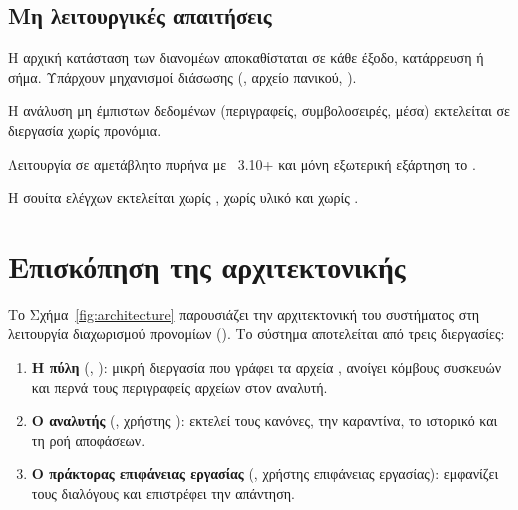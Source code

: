 \subsection{Μη λειτουργικές απαιτήσεις}

\begin{requirement}\label{req:lockout}
Η αρχική κατάσταση των διανομέων αποκαθίσταται σε κάθε έξοδο, κατάρρευση ή
σήμα. Υπάρχουν μηχανισμοί διάσωσης (, αρχείο πανικού,
).
\end{requirement}

\begin{requirement}\label{req:privsep}
Η ανάλυση μη έμπιστων δεδομένων (περιγραφείς, συμβολοσειρές, μέσα) εκτελείται σε
διεργασία χωρίς προνόμια.
\end{requirement}

\begin{requirement}[Φορητότητα]\label{req:portable}
Λειτουργία σε αμετάβλητο πυρήνα  με ~3.10+ και μόνη
εξωτερική εξάρτηση το .
\end{requirement}

\begin{requirement}[Ελεγξιμότητα]\label{req:testable}
Η σουίτα ελέγχων εκτελείται χωρίς , χωρίς υλικό  και χωρίς
.
\end{requirement}

\section{Επισκόπηση της αρχιτεκτονικής}
\label{sec:architecture}

Το Σχήμα~\ref{fig:architecture} παρουσιάζει την αρχιτεκτονική του συστήματος
στη λειτουργία διαχωρισμού προνομίων (). Το σύστημα αποτελείται
από τρεις διεργασίες:

\begin{enumerate}
  \item \textbf{Η πύλη} (, ): μικρή διεργασία που γράφει τα
        αρχεία , ανοίγει κόμβους συσκευών και περνά τους
        περιγραφείς αρχείων στον αναλυτή.
  \item \textbf{Ο αναλυτής} (, χρήστης ): εκτελεί
        τους κανόνες, την καραντίνα, το ιστορικό και τη ροή αποφάσεων.
  \item \textbf{Ο πράκτορας επιφάνειας εργασίας} (, χρήστης
        επιφάνειας εργασίας): εμφανίζει τους διαλόγους και επιστρέφει την
        απάντηση.
\end{enumerate}

